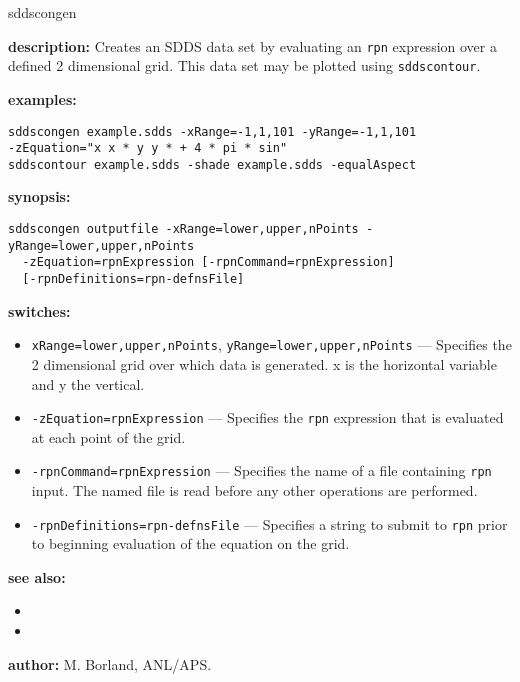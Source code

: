\begin{sddsprog}{sddscongen}
  \item \textbf{description:}
    Creates an SDDS data set by evaluating an \verb|rpn| expression over a defined 2 dimensional grid. This data set may be plotted using \verb|sddscontour|.
  \item \textbf{examples:}
\begin{verbatim}
sddscongen example.sdds -xRange=-1,1,101 -yRange=-1,1,101
-zEquation="x x * y y * + 4 * pi * sin"
sddscontour example.sdds -shade example.sdds -equalAspect
\end{verbatim}
  \item \textbf{synopsis:}
\begin{verbatim}
sddscongen outputfile -xRange=lower,upper,nPoints -yRange=lower,upper,nPoints
  -zEquation=rpnExpression [-rpnCommand=rpnExpression]
  [-rpnDefinitions=rpn-defnsFile]
\end{verbatim}
  \item \textbf{switches:}
    \begin{itemize}
      \item {\tt xRange=lower,upper,nPoints}, {\tt yRange=lower,upper,nPoints} --- Specifies the 2 dimensional grid over which data is generated. x is the horizontal variable and y the vertical.
      \item {\tt -zEquation=rpnExpression} --- Specifies the \verb|rpn| expression that is evaluated at each point of the grid.
      \item {\tt -rpnCommand=rpnExpression} --- Specifies the name of a file containing \verb|rpn| input. The named file is read before any other operations are performed.
      \item {\tt -rpnDefinitions=rpn-defnsFile} --- Specifies a string to submit to \verb|rpn| prior to beginning evaluation of the equation on the grid.
    \end{itemize}
  \item \textbf{see also:}
    \begin{itemize}
      \item {}
      \item {}
    \end{itemize}
  \item \textbf{author:} M. Borland, ANL/APS.
\end{sddsprog}

